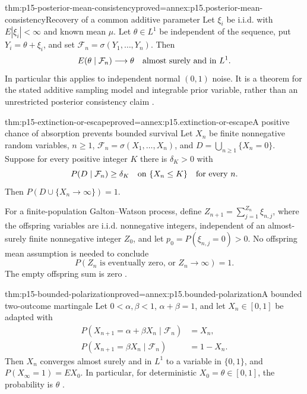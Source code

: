\begin{hbtheorem}{thm:p15-posterior-mean-consistency}{proved=annex:p15.posterior-mean-consistency}{Recovery of a common additive parameter}
Let \(\xi_i\) be i.i.d. with \(E|\xi_i|<\infty\) and known mean \(\mu\).
Let \(\theta\in L^1\) be independent of the sequence, put
\(Y_i=\theta+\xi_i\), and set
\(\mathcal F_n=\sigma(Y_1,\ldots,Y_n)\).
Then
\[
                    E(\theta\mid\mathcal F_n)\longrightarrow\theta
                           \quad\hbox{almost surely and in }L^1.
\]
In particular this applies to independent normal \((0,1)\) noise.
It is a theorem for the stated additive sampling model and integrable
prior variable, rather than an unrestricted posterior consistency claim
\cite[ex.~4.6.1]{DurrettPTEAuthor2019}.
\end{hbtheorem}

\begin{hbtheorem}{thm:p15-extinction-or-escape}{proved=annex:p15.extinction-or-escape}{A positive chance of absorption prevents bounded survival}
Let \(X_n\) be finite nonnegative random variables, \(n\geq1\),
\(\mathcal F_n=\sigma(X_1,\ldots,X_n)\), and
\(D=\bigcup_{n\geq1}\{X_n=0\}\).
Suppose for every positive integer \(K\) there is \(\delta_K>0\) with
\[
       P(D\mid\mathcal F_n)\geq\delta_K
                              \quad\hbox{on }\{X_n\leq K\}
                              \quad\text{for every }n.
\]
Then \(P(D\cup\{X_n\to\infty\})=1\).

For a finite-population Galton--Watson process, define
\(Z_{n+1}=\sum_{j=1}^{Z_n}\xi_{n,j}\), where the offspring variables
are i.i.d. nonnegative integers, independent of an almost-surely finite
nonnegative integer \(Z_0\),
and let \(p_0=P(\xi_{n,j}=0)>0\).
No offspring mean assumption is needed to conclude
\[
             P(Z_n\text{ is eventually zero, or }Z_n\to\infty)=1.
\]
The empty offspring sum is zero
\cite[exs.~4.6.4--5]{DurrettPTEAuthor2019}.
\end{hbtheorem}

\begin{hbtheorem}{thm:p15-bounded-polarization}{proved=annex:p15.bounded-polarization}{A bounded two-outcome martingale}
Let \(0<\alpha,\beta<1\), \(\alpha+\beta=1\), and let
\(X_n\in[0,1]\) be adapted with
\[
 \begin{split}
 P(X_{n+1}=\alpha+\beta X_n\mid\mathcal F_n)&=X_n,\\
 P(X_{n+1}=\beta X_n\mid\mathcal F_n)&=1-X_n.
 \end{split}
\]
Then \(X_n\) converges almost surely and in \(L^1\) to a variable
in \(\{0,1\}\), and \(P(X_\infty=1)=EX_0\).
In particular, for deterministic \(X_0=\theta\in[0,1]\), the probability
is \(\theta\) \cite[ex.~4.6.6]{DurrettPTEAuthor2019}.
\end{hbtheorem}

